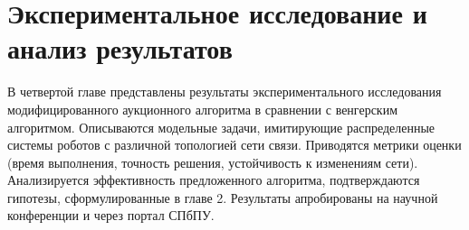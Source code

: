 \chapter{Экспериментальное исследование и анализ результатов} \label{ch4}

В четвертой главе представлены результаты экспериментального исследования модифицированного аукционного алгоритма в сравнении с венгерским алгоритмом. Описываются модельные задачи, имитирующие распределенные системы роботов с различной топологией сети связи. Приводятся метрики оценки (время выполнения, точность решения, устойчивость к изменениям сети). Анализируется эффективность предложенного алгоритма, подтверждаются гипотезы, сформулированные в главе 2. Результаты апробированы на научной конференции и через портал СПбПУ.